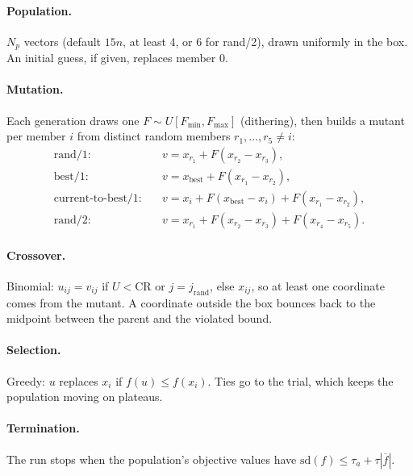 \documentclass[11pt,a4paper]{article}
\begin{document}
\paragraph{Population.} $N_p$ vectors (default $15n$, at least 4, or 6 for rand/2), drawn
uniformly in the box. An initial guess, if given, replaces member 0.

\paragraph{Mutation.} Each generation draws one $F\sim U[F_{\min},F_{\max}]$ (dithering),
then builds a mutant per member $i$ from distinct random members $r_1,\dots,r_5\ne i$:
\begin{align*}
  \text{rand/1:}\quad& v=x_{r_1}+F(x_{r_2}-x_{r_3}),\\
  \text{best/1:}\quad& v=x_{\text{best}}+F(x_{r_1}-x_{r_2}),\\
  \text{current-to-best/1:}\quad& v=x_i+F(x_{\text{best}}-x_i)+F(x_{r_1}-x_{r_2}),\\
  \text{rand/2:}\quad& v=x_{r_1}+F(x_{r_2}-x_{r_3})+F(x_{r_4}-x_{r_5}).
\end{align*}

\paragraph{Crossover.} Binomial: $u_{ij}=v_{ij}$ if $U<\mathrm{CR}$ or $j=j_{\text{rand}}$,
else $x_{ij}$, so at least one coordinate comes from the mutant. A coordinate outside the
box bounces back to the midpoint between the parent and the violated bound.

\paragraph{Selection.} Greedy: $u$ replaces $x_i$ if $f(u)\le f(x_i)$. Ties go to the trial,
which keeps the population moving on plateaus.

\paragraph{Termination.} The run stops when the population's objective values have
$\mathrm{sd}(f)\le\tau_a+\tau|\overline f|$.
\end{document}
